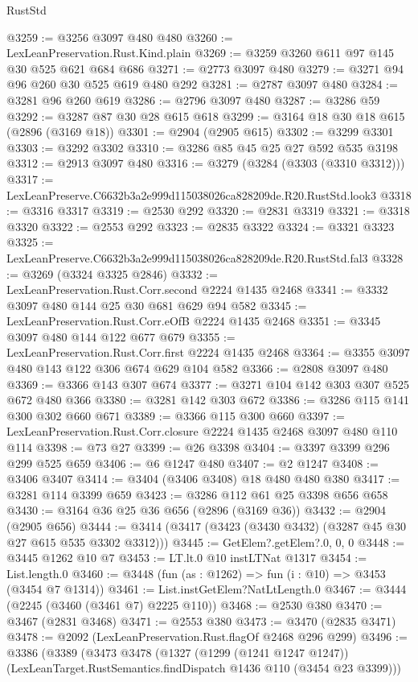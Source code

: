 \begin{lexlean}{RustStd}
\begin{coremodule}
@3259 := @3256 @3097 @480 @480
@3260 := LexLeanPreservation.Rust.Kind.plain
@3269 := @3259 @3260 @611 @97 @145 @30 @525 @621 @684 @686
@3271 := @2773 @3097 @480
@3279 := @3271 @94 @96 @260 @30 @525 @619 @480 @292
@3281 := @2787 @3097 @480
@3284 := @3281 @96 @260 @619
@3286 := @2796 @3097 @480
@3287 := @3286 @59
@3292 := @3287 @87 @30 @28 @615 @618
@3299 := @3164 @18 @30 @18 @615 (@2896 (@3169 @18))
@3301 := @2904 (@2905 @615)
@3302 := @3299 @3301
@3303 := @3292 @3302
@3310 := @3286 @85 @45 @25 @27 @592 @535 @3198
@3312 := @2913 @3097 @480
@3316 := @3279 (@3284 (@3303 (@3310 @3312)))
@3317 := LexLeanPreserve.C6632b3a2e999d115038026ca828209de.R20.RustStd.look3
@3318 := @3316 @3317
@3319 := @2530 @292
@3320 := @2831 @3319
@3321 := @3318 @3320
@3322 := @2553 @292
@3323 := @2835 @3322
@3324 := @3321 @3323
@3325 := LexLeanPreserve.C6632b3a2e999d115038026ca828209de.R20.RustStd.fal3
@3328 := @3269 (@3324 @3325 @2846)
@3332 := LexLeanPreservation.Rust.Corr.second @2224 @1435 @2468
@3341 := @3332 @3097 @480 @144 @25 @30 @681 @629 @94 @582
@3345 := LexLeanPreservation.Rust.Corr.eOfB @2224 @1435 @2468
@3351 := @3345 @3097 @480 @144 @122 @677 @679
@3355 := LexLeanPreservation.Rust.Corr.first @2224 @1435 @2468
@3364 := @3355 @3097 @480 @143 @122 @306 @674 @629 @104 @582
@3366 := @2808 @3097 @480
@3369 := @3366 @143 @307 @674
@3377 := @3271 @104 @142 @303 @307 @525 @672 @480 @366
@3380 := @3281 @142 @303 @672
@3386 := @3286 @115 @141 @300 @302 @660 @671
@3389 := @3366 @115 @300 @660
@3397 := LexLeanPreservation.Rust.Corr.closure @2224 @1435 @2468 @3097 @480 @110 @114
@3398 := @73 @27
@3399 := @26 @3398
@3404 := @3397 @3399 @296 @299 @525 @659
@3406 := @6 @1247 @480
@3407 := @2 @1247
@3408 := @3406 @3407
@3414 := @3404 (@3406 @3408) @18 @480 @480 @380
@3417 := @3281 @114 @3399 @659
@3423 := @3286 @112 @61 @25 @3398 @656 @658
@3430 := @3164 @36 @25 @36 @656 (@2896 (@3169 @36))
@3432 := @2904 (@2905 @656)
@3444 := @3414 (@3417 (@3423 (@3430 @3432) (@3287 @45 @30 @27 @615 @535 @3302 @3312)))
@3445 := GetElem?.getElem?.{0, 0, 0}
@3448 := @3445 @1262 @10 @7
@3453 := LT.lt.{0} @10 instLTNat @1317
@3454 := List.length.{0}
@3460 := @3448 (fun (as : @1262) => fun (i : @10) => @3453 (@3454 @7 @1314))
@3461 := List.instGetElem?NatLtLength.{0}
@3467 := @3444 (@2245 (@3460 (@3461 @7) @2225 @110))
@3468 := @2530 @380
@3470 := @3467 (@2831 @3468)
@3471 := @2553 @380
@3473 := @3470 (@2835 @3471)
@3478 := @2092 (LexLeanPreservation.Rust.flagOf @2468 @296 @299)
@3496 := @3386
    (@3389
      (@3473
        @3478
        (@1327
          (@1299 (@1241 @1247 @1247))
          (LexLeanTarget.RustSemantics.findDispatch @1436 @110 (@3454 @23 @3399)))

\end{coremodule}
\end{lexlean}
